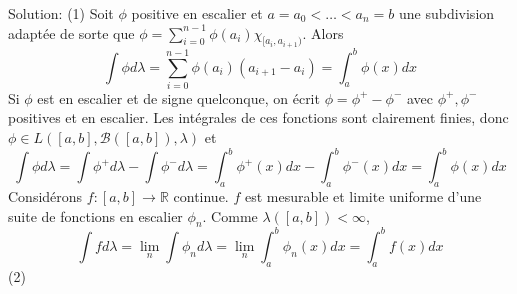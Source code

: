\documentclass{report}
\begin{document}
Solution: (1) Soit $\phi$ positive en escalier et $a=a_0<\ldots<a_n =b$ une subdivision adaptée de sorte que $\phi = \sum_{i=0}^{n-1} \phi(a_i)\chi_{[a_i,a_{i+1})}$. Alors $$\int \phi d\lambda = \sum_{i=0}^{n-1} \phi(a_i) (a_{i+1}-a_i) = \int_a^b \phi(x)dx$$
Si $\phi$ est en escalier et de signe quelconque, on écrit $\phi = \phi^+ -\phi ^-$ avec $\phi^+,\phi^-$ positives et en escalier. Les intégrales de ces fonctions sont clairement finies, donc $\phi \in L([a,b],\mathcal B([a,b]),\lambda)$ et $$\int \phi d\lambda = \int \phi^+ d\lambda - \int \phi^- d\lambda =\int_a^b \phi^+(x) dx - \int_a^b \phi^-(x) dx = \int_a^b \phi(x) dx $$
Considérons $f:[a,b]\to \mathbb R$ continue. $f$ est mesurable et limite uniforme d'une suite de fonctions en escalier $\phi_n$. Comme $\lambda([a,b])<\infty$, $$\int f d\lambda = \lim_n \int \phi_n d\lambda = \lim_n \int_a^b \phi_n(x) dx  =\int_a^b f(x) dx$$
\newline
(2)
\end{document}
